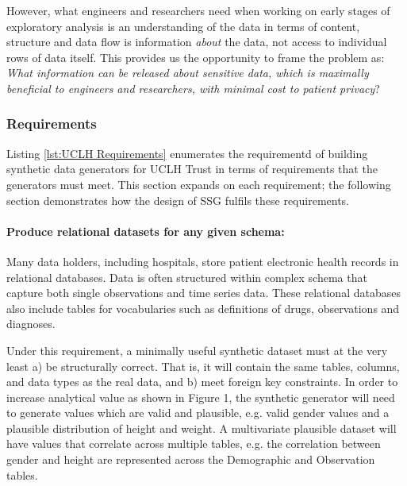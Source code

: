 \documentclass[11pt]{article}
\begin{document}
However, what engineers and researchers need when working on early stages of exploratory analysis is an understanding of the data in terms of content, structure and data flow is information \emph{about} the data, not access to individual rows of data itself. This provides us the opportunity to frame the problem as: \emph{What information can be released about sensitive data, which is maximally beneficial to engineers and researchers, with minimal cost to patient privacy}?

\subsubsection{Requirements}

Listing \ref{lst:UCLH Requirements} enumerates the requirementd of building synthetic data generators for UCLH Trust in terms of requirements that the generators must meet. This section expands on each requirement; the following section demonstrates how the design of SSG fulfils these requirements.


\paragraph{Produce relational datasets for any given schema:}

Many data holders, including hospitals, store patient electronic health records in relational databases. Data is often structured within complex schema that capture both single observations and time series data. These relational databases also include tables for vocabularies such as definitions of drugs, observations and diagnoses. 

Under this requirement, a minimally useful synthetic dataset must at the very least a) be structurally correct. That is, it will contain the same tables, columns, and data types as the real data, and b) meet foreign key constraints. In order to increase analytical value as shown in Figure 1, the synthetic generator will need to generate values which are valid and plausible, e.g. valid gender values and a plausible distribution of height and weight.  A multivariate plausible dataset will have values that correlate across multiple tables, e.g. the correlation between gender and height are represented across the Demographic and Observation tables. 
\end{document}
